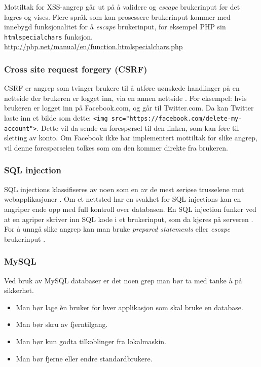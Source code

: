 Mottiltak for XSS-angrep går ut på å validere og \textit{escape} brukerinput før det lagres og vises.
Flere språk som kan prosessere brukerinput kommer med innebygd funksjonalitet for å \textit{escape} brukerinput, for eksempel PHP sin \lstinline{htmlspecialchars} funksjon. \url{http://php.net/manual/en/function.htmlspecialchars.php}

\subsubsection{Cross site request forgery (CSRF)}
\label{sec:analysis-security-csrf}
CSRF er angrep som tvinger brukere til å utføre uønskede handlinger på en nettside der brukeren er logget inn, via en annen nettside \cite[s.~183-186]{NattTomHeine2015Datasikkerhet}. For eksempel: hvis brukeren er logget inn på Facebook.com, og går til Twitter.com. Da kan Twitter laste inn et bilde som dette: \lstinline{<img src="https://facebook.com/delete-my-account">}. Dette vil da sende en forespørsel til den linken, som kan føre til sletting av konto. Om Facebook ikke har implementert mottiltak for slike angrep, vil denne forespørselen tolkes som om den kommer direkte fra brukeren.

\subsubsection{SQL injection}
\label{sec:analysis-security-sql-injection}
SQL injections klassifiseres av noen som en av de mest seriøse trusselene mot webapplikasjoner \cite[s.~1]{halfond2006classification}. Om et nettsted har en svakhet for SQL injections kan en angriper ende opp med full kontroll over databasen.
En SQL injection funker ved at en agriper skriver inn SQL kode i et brukerinput, som da kjøres på serveren \cite[s.~2]{halfond2006classification}.
For å unngå slike angrep kan man bruke \textit{prepared statements} eller \textit{escape} brukerinput \cite[s.~6]{halfond2006classification}.

\subsubsection{MySQL}
\label{sec:analysis-security-mysql}
Ved bruk av MySQL databaser er det noen grep man bør ta med tanke 
å på sikkerhet.
\begin{itemize}
\item Man bør lage èn bruker for hver applikasjon som skal bruke en database. \cite{ellingwood_2013}
\item Man bør skru av fjerntilgang.
\item Man bør kun godta tilkoblinger fra lokalmaskin.
\item Man bør fjerne eller endre standardbrukere.
\end{itemize}

